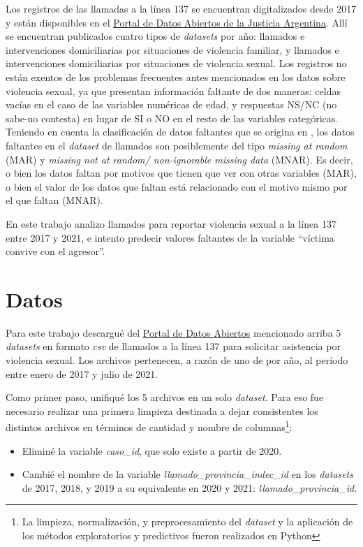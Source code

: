 \documentclass[10 pt]{article}
\begin{document}
Los registros de las llamadas a la línea 137 se encuentran digitalizados desde 2017 y están disponibles en el \href{http://datos.jus.gob.ar/}{Portal de Datos Abiertos de la Justicia Argentina}. Allí se encuentran publicados cuatro tipos de \textit{datasets} por año: llamados e intervenciones domiciliarias por situaciones de violencia familiar, y llamados e intervenciones domiciliarias por situaciones de violencia sexual.
Los registros no están exentos de los problemas frecuentes antes mencionados en los datos sobre violencia sexual, ya que presentan información faltante de dos maneras: celdas vacías en el caso de las variables numéricas de edad, y respuestas NS/NC (no sabe-no contesta) en lugar de SI o NO en el resto de las variables categóricas. Teniendo en cuenta la clasificación de datos faltantes que se origina en \citet{rubin1976inference}, los datos faltantes en el \textit{dataset} de llamados son posiblemente del tipo \textit{missing at random} (MAR) y \textit{missing not at random/ non-ignorable missing data} (MNAR). Es decir, o bien los datos faltan por motivos que tienen que ver con otras variables (MAR), o bien el valor de los datos que faltan está relacionado con el motivo mismo por el que faltan (MNAR).

En este trabajo analizo llamados para reportar violencia sexual a la línea 137 entre 2017 y 2021, e intento predecir valores faltantes de la variable “víctima convive con el agresor”. 



\section*{Datos}\label{datos}

Para este trabajo descargué del \href{http://datos.jus.gob.ar/}{Portal de Datos Abiertos} mencionado arriba 5 \textit{datasets} en formato \textit{csv} de llamados a la línea 137 para solicitar asistencia por violencia sexual. Los archivos pertenecen, a razón de uno de por año, al período entre enero de 2017 y julio de 2021. 

Como primer paso, unifiqué los 5 archivos en un solo \textit{dataset}. Para eso fue necesario realizar una primera limpieza destinada a dejar consistentes los distintos archivos en términos de cantidad y nombre de columnas\footnote{La limpieza, normalización, y preprocesamiento del \textit{dataset} y la aplicación de los métodos exploratorios y predictivos fueron realizados en Python}:

\begin{itemize}
    \item Eliminé la variable \textit{caso\_id}, que solo existe a partir de 2020.
    \item Cambié el nombre de la variable \textit{llamado\_provincia\_indec\_id} en los \textit{datasets} de 2017, 2018, y 2019 a su equivalente en 2020 y 2021: \textit{llamado\_provincia\_id}.
\end{itemize}
\end{document}
